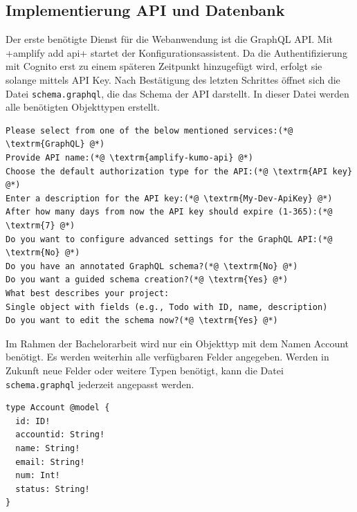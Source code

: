 \subsection{Implementierung API und Datenbank}
Der erste benötigte Dienst für die Webanwendung ist die GraphQL API.
Mit \spverb+amplify add api+ startet der Konfigurationsassistent.
Da die Authentifizierung mit Cognito erst zu einem späteren Zeitpunkt hinzugefügt wird, erfolgt sie solange mittels API Key.
Nach Bestätigung des letzten Schrittes öffnet sich die Datei \verb+schema.graphql+, die das Schema der API darstellt.
In dieser Datei werden alle benötigten Objekttypen erstellt.
\clearpage
\begin{lstlisting}[basicstyle=\ttfamily\small, breaklines=true , frame = single, backgroundcolor=\color{flashwhite} ]
Please select from one of the below mentioned services:(*@ \textrm{GraphQL} @*)
Provide API name:(*@ \textrm{amplify-kumo-api} @*)
Choose the default authorization type for the API:(*@ \textrm{API key} @*)
Enter a description for the API key:(*@ \textrm{My-Dev-ApiKey} @*)
After how many days from now the API key should expire (1-365):(*@ \textrm{7} @*)
Do you want to configure advanced settings for the GraphQL API:(*@ \textrm{No} @*)
Do you have an annotated GraphQL schema?(*@ \textrm{No} @*)
Do you want a guided schema creation?(*@ \textrm{Yes} @*)
What best describes your project:
Single object with fields (e.g., Todo with ID, name, description)
Do you want to edit the schema now?(*@ \textrm{Yes} @*)
\end{lstlisting}

Im Rahmen der Bachelorarbeit wird nur ein Objekttyp mit dem Namen Account benötigt.
Es werden weiterhin alle verfügbaren Felder angegeben.
Werden in Zukunft neue Felder oder weitere Typen benötigt, kann die Datei \verb+schema.graphql+ jederzeit angepasst werden.
\\
\begin{lstlisting}[basicstyle=\ttfamily\small, breaklines=true , frame = single, backgroundcolor=\color{flashwhite} ]
type Account @model {
  id: ID!
  accountid: String!
  name: String!
  email: String!
  num: Int!
  status: String!
}

\end{lstlisting}

